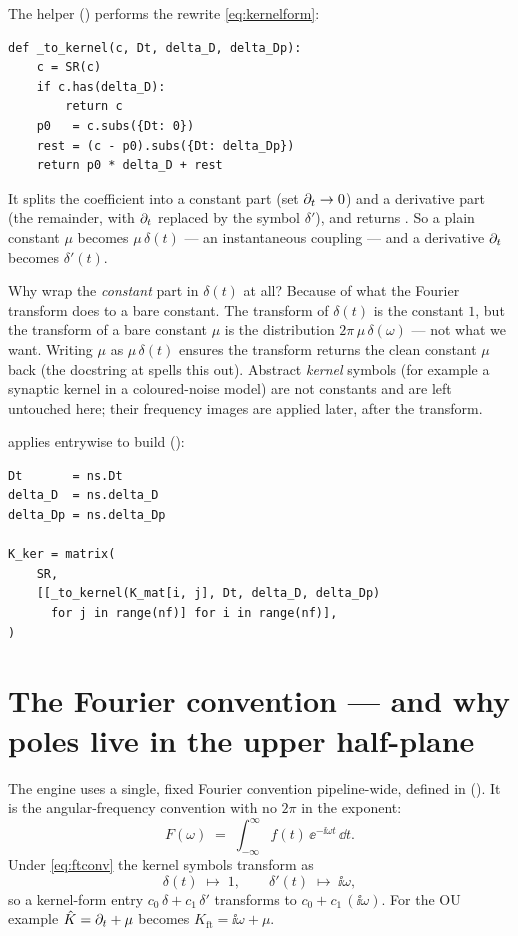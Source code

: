 The helper  () performs the
rewrite \eqref{eq:kernelform}:

\begin{lstlisting}
def _to_kernel(c, Dt, delta_D, delta_Dp):
    c = SR(c)
    if c.has(delta_D):
        return c
    p0   = c.subs({Dt: 0})
    rest = (c - p0).subs({Dt: delta_Dp})
    return p0 * delta_D + rest
\end{lstlisting}

It splits the coefficient into a constant part  (set $\partial_t \to 0$) and a
derivative part  (the remainder, with $\partial_t$ replaced by the symbol
$\delta'$), and returns . So a plain constant $\mu$
becomes $\mu\,\delta(t)$ --- an instantaneous coupling --- and a derivative $\partial_t$
becomes $\delta'(t)$.

Why wrap the \emph{constant} part in $\delta(t)$ at all? Because of what the
Fourier transform does to a bare constant. The transform of $\delta(t)$ is the
constant $1$, but the transform of a bare constant $\mu$ is the distribution
$2\pi\,\mu\,\delta(\omega)$ --- not what we want. Writing $\mu$ as $\mu\,\delta(t)$
ensures the transform returns the clean constant $\mu$ back (the docstring at
 spells this out). Abstract \emph{kernel}
symbols (for example a synaptic kernel  in a coloured-noise model) are
not constants and are left untouched here; their frequency images are applied
later, after the transform.

 applies  entrywise to build
 ():

\begin{lstlisting}
Dt       = ns.Dt
delta_D  = ns.delta_D
delta_Dp = ns.delta_Dp

K_ker = matrix(
    SR,
    [[_to_kernel(K_mat[i, j], Dt, delta_D, delta_Dp)
      for j in range(nf)] for i in range(nf)],
)
\end{lstlisting}

\section{The Fourier convention --- and why poles live in the upper half-plane}

The engine uses a single, fixed Fourier convention pipeline-wide, defined in
 (). It is the
angular-frequency convention with no $2\pi$ in the exponent:
\begin{equation}
  F(\omega) \;=\; \int_{-\infty}^{\infty} f(t)\,\ee^{-\ii\omega t}\,\dd t.
  \label{eq:ftconv}
\end{equation}
Under \eqref{eq:ftconv} the kernel symbols transform as
\[
  \delta(t) \;\longmapsto\; 1, \qquad
  \delta'(t) \;\longmapsto\; \ii\omega,
\]
so a kernel-form entry $c_0\,\delta + c_1\,\delta'$ transforms to $c_0 + c_1\,
(\ii\omega)$. For the OU example $\hat K = \partial_t + \mu$ becomes $K_{\mathrm{ft}} =
\ii\omega + \mu$.

